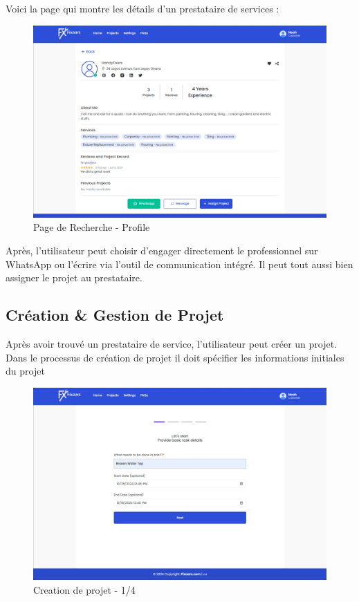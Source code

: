 {Voici la page qui montre les détails d'un prestataire de services :

\vspace{0.35cm}
\begin{figure}[H]
\begin{center}
\includegraphics[width=12cm]{assets/demo/search-profile.png}
\end{center}
\caption{Page de Recherche - Profile}
\end{figure}

Après, l'utilisateur peut choisir d'engager directement le professionnel sur WhatsApp ou l'écrire via l'outil de communication intégré. Il peut tout aussi bien assigner le projet au prestataire. 


\subsection{Création \& Gestion de Projet}

Après avoir trouvé un prestataire de service, l'utilisateur peut créer un projet. Dans le processus de création de projet il doit spécifier les informations initiales du projet 


\vspace{0.35cm}
\begin{figure}[H]
\begin{center}
\includegraphics[width=12cm]{assets/demo/setup-1.png}
\end{center}
\caption{Creation de projet - 1/4}
\end{figure}

}
